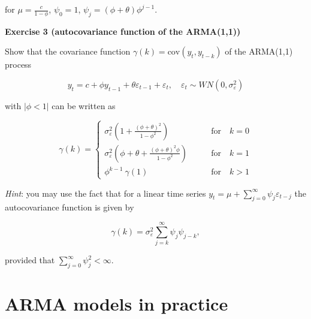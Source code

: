 \documentclass[
]{book}
\begin{document}
for \(\mu = \frac{c}{1-\phi}\), \(\psi_0 = 1\), \(\psi_j = (\phi + \theta)\phi^{j-1}\).

\textbf{Exercise 3 (autocovariance function of the ARMA(1,1))}

Show that the covariance function \(\gamma(k) = \text{cov}(y_t, y_{t-k})\) of the ARMA(1,1) process

\[
y_t = c + \phi y_{t-1} + \theta \varepsilon_{t-1} + \varepsilon_t, \quad \varepsilon_t \sim WN(0, \sigma^2_\varepsilon)
\]

with \(|\phi < 1|\) can be written as

\[
\gamma(k) = 
\begin{cases}
\sigma^2_\varepsilon \left(1 + \frac{(\phi+\theta)^2}{1-\phi^2}\right) & \qquad \text{for} \quad k=0 \\[1em]
\sigma^2_\varepsilon \left(\phi+\theta + \frac{(\phi+\theta)^2\phi}{1-\phi^2}\right) & \qquad \text{for} \quad k=1 \\[1em]
\phi^{k-1} \ \gamma(1) &  \qquad \text{for} \quad k>1 
\end{cases}
\]

\emph{Hint}: you may use the fact that for a linear time series \(y_t = \mu + \sum_{j=0}^\infty \psi_j \varepsilon_{t-j}\) the autocovariance function is given by

\[
\gamma(k) = \sigma^2_\varepsilon \sum_{j=k}^\infty \psi_j \psi_{j-k},
\]

provided that \(\sum_{j=0}^{\infty} \psi_j^2 < \infty\).

\hypertarget{session05}{%
\chapter{ARMA models in practice}\label{session05}}
\end{document}
